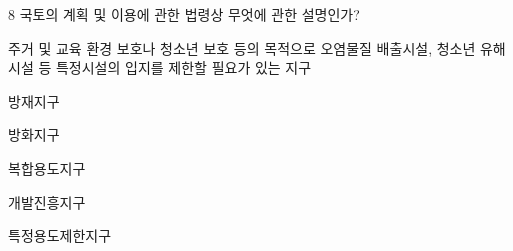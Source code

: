 \begin{question}{8}
국토의 계획 및 이용에 관한 법령상 무엇에 관한 설명인가?
\begin{framedtext}
주거 및 교육 환경 보호나 청소년 보호 등의 목적으로 오염물질 배출시설, 청소년 유해시설 등 특정시설의 입지를 제한할 필요가 있는 지구 \par
\end{framedtext}
\begin{choices}
  \item 방재지구
  \item 방화지구
  \item 복합용도지구
  \item 개발진흥지구
  \item 특정용도제한지구
\end{choices}
\end{question}
